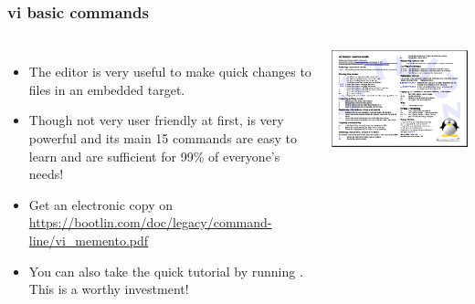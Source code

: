 \begin{frame}
  \frametitle{vi basic commands}
  \begin{columns}
    \begin{itemize}
      \item The  editor is very useful to make quick
      changes to files in an embedded target.
      \item Though not very user friendly at first, 
      is very powerful and its main 15 commands are easy to
      learn and are sufficient for 99\% of everyone's needs!
      \item Get an electronic copy on
      \url{https://bootlin.com/doc/legacy/command-line/vi_memento.pdf}
      \item You can also take the quick tutorial by running
      . This is a worthy investment!
    \end{itemize}
    \includegraphics[width=\textwidth]{slides/course-information/vi_memento.png}
  \end{columns}
\end{frame}

